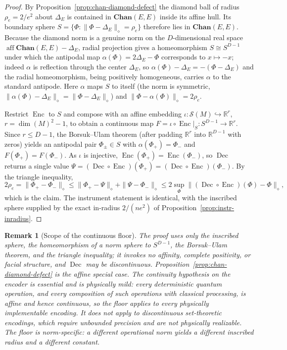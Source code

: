 \documentclass[11pt]{article}
\newtheorem{remark}[theorem]{Remark}
\DeclareMathOperator{\aff}{aff}
\begin{document}
\begin{proof}
By Proposition~\ref{prop:chan-diamond-defect} the diamond ball of radius
$\rho_e=2/e^2$ about $\Delta_E$ is contained in $\mathbf{Chan}(E,E)$ inside its
affine hull. Its boundary sphere
$S=\{\Phi:\|\Phi-\Delta_E\|_\diamond=\rho_e\}$ therefore lies in
$\mathbf{Chan}(E,E)$. Because the diamond norm is a genuine norm on the
$D$-dimensional real space $\aff\mathbf{Chan}(E,E)-\Delta_E$, radial projection
gives a homeomorphism $S\cong S^{D-1}$ under which the antipodal map
$\alpha(\Phi)=2\Delta_E-\Phi$ corresponds to $x\mapsto-x$; indeed $\alpha$ is
reflection through the center $\Delta_E$, so $\alpha(\Phi)-\Delta_E=
-(\Phi-\Delta_E)$ and the radial homeomorphism, being positively homogeneous,
carries $\alpha$ to the standard antipode. Here $\alpha$ maps
$S$ to itself (the norm is symmetric, $\|\alpha(\Phi)-\Delta_E\|_\diamond=
\|\Phi-\Delta_E\|_\diamond$) and $\|\Phi-\alpha(\Phi)\|_\diamond=2\rho_e$.

Restrict $\operatorname{Enc}$ to $S$ and compose with an affine embedding
$\iota:\mathcal S(M)\hookrightarrow\mathbb R^{r}$, $r=\dim(M)^2-1$, to obtain a
continuous map $F=\iota\circ\operatorname{Enc}|_S:S^{D-1}\to\mathbb R^{r}$.
Since $r\le D-1$, the Borsuk--Ulam theorem \cite{Matousek2003} (after padding
$\mathbb R^{r}$ into $\mathbb R^{D-1}$ with zeros) yields an antipodal pair
$\Phi_\pm\in S$ with $\alpha(\Phi_+)=\Phi_-$ and $F(\Phi_+)=F(\Phi_-)$. As
$\iota$ is injective, $\operatorname{Enc}(\Phi_+)=\operatorname{Enc}(\Phi_-)$,
so $\operatorname{Dec}$ returns a single value
$\Psi=(\operatorname{Dec}\circ\operatorname{Enc})(\Phi_+)
=(\operatorname{Dec}\circ\operatorname{Enc})(\Phi_-)$. By the triangle
inequality,
\[
2\rho_e=\|\Phi_+-\Phi_-\|_\diamond
\le\|\Phi_+-\Psi\|_\diamond+\|\Psi-\Phi_-\|_\diamond
\le 2\sup_{\Phi}\|(\operatorname{Dec}\circ\operatorname{Enc})(\Phi)-\Phi\|_\diamond,
\]
which is the claim. The instrument statement is identical, with the inscribed
sphere supplied by the exact in-radius $2/(ne^2)$ of
Proposition~\ref{prop:instr-inradius}.
\end{proof}

\begin{remark}[Scope of the continuous floor]
\label{rem:continuous-scope}
The proof uses only the inscribed sphere, the homeomorphism of a norm sphere to
$S^{D-1}$, the Borsuk--Ulam theorem, and the triangle inequality; it invokes no
affinity, complete positivity, or facial structure, and $\operatorname{Dec}$ may
be discontinuous. Proposition~\ref{prop:chan-diamond-defect} is the affine
special case. The continuity hypothesis on the encoder is essential and is
physically mild: every deterministic quantum operation, and every composition of
such operations with classical processing, is affine and hence continuous, so
the floor applies to every physically implementable encoding. It does not apply
to discontinuous set-theoretic encodings, which require unbounded precision and
are not physically realizable. The floor is norm-specific: a different
operational norm yields a different inscribed radius and a different constant.
\end{remark}
\end{document}
